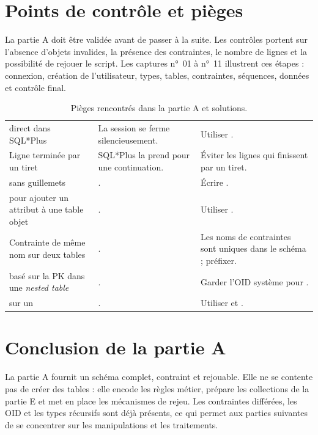 \section{Points de contrôle et pièges}

La partie A doit être validée avant de passer à la suite. Les contrôles
portent sur l'absence d'objets invalides, la présence des contraintes, le
nombre de lignes et la possibilité de rejouer le script. Les captures
n°~01 à n°~11 illustrent ces étapes : connexion, création de l'utilisateur,
types, tables, contraintes, séquences, données et contrôle final.

\begin{table}[htbp]
  \centering
  \small
  \caption{Pièges rencontrés dans la partie A et solutions.}
  \label{tab:pieges-partieA}
  \begin{tabularx}{\textwidth}{@{}L{4.7cm}L{5.1cm}X@{}}
    \toprule
     &  &  \\
    \midrule
     direct dans SQL*Plus &
    La session se ferme silencieusement. &
    Utiliser . \\
    Ligne terminée par un tiret &
    SQL*Plus la prend pour une continuation. &
    Éviter les lignes qui finissent par un tiret. \\
     sans guillemets &
    . &
    Écrire . \\
     pour ajouter un attribut à une table objet &
    . &
    Utiliser . \\
    Contrainte de même nom sur deux tables &
    . &
    Les noms de contraintes sont uniques dans le schéma ; préfixer. \\
     basé sur la PK dans une \emph{nested table} &
    . &
    Garder l'OID système pour . \\
     sur un  &
    . &
    Utiliser  et . \\
    \bottomrule
  \end{tabularx}
\end{table}

\section{Conclusion de la partie A}

La partie A fournit un schéma complet, contraint et rejouable. Elle ne se
contente pas de créer des tables : elle encode les règles métier, prépare les
collections de la partie E et met en place les mécanismes de rejeu. Les
contraintes différées, les OID et les types récursifs sont déjà présents, ce
qui permet aux parties suivantes de se concentrer sur les manipulations et les
traitements.
